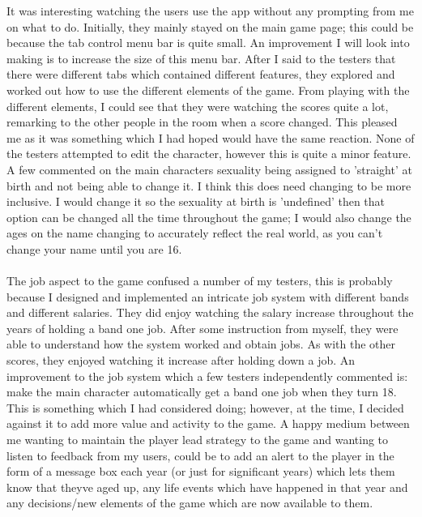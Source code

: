 It was interesting watching the users use the app without any prompting from me on what to do. Initially, they mainly stayed on the main game page; this could be because the tab control menu bar is quite small. An improvement I will look into making is to increase the size of this menu bar. After I said to the testers that there were different tabs which contained different features, they explored and worked out how to use the different elements of the game. From playing with the different elements, I could see that they were watching the scores quite a lot, remarking to the other people in the room when a score changed. This pleased me as it was something which I had hoped would have the same reaction. None of the testers attempted to edit the character, however this is quite a minor feature. A few commented on the main characters sexuality being assigned to 'straight' at birth and not being able to change it. I think this does need changing to be more inclusive. I would change it so the sexuality at birth is 'undefined' then that option can be changed all the time throughout the game; I would also change the ages on the name changing to accurately reflect the real world, as you can't change your name until you are 16. \\ \\
The job aspect to the game confused a number of my testers, this is probably because I designed and implemented an intricate job system with different bands and different salaries. They did enjoy watching the salary increase throughout the years of holding a band one job. After some instruction from myself, they were able to understand how the system worked and obtain jobs. As with the other scores, they enjoyed watching it increase after holding down a job.
An improvement to the job system which a few testers independently commented is: make the main  character automatically get a band one job when they turn 18. This is something which I had considered doing; however, at the time, I decided against it to add more value and activity to the game. A happy medium between me wanting to maintain the player lead strategy to the game and wanting to listen to feedback from my users, could be to add an alert to the player in the form of a message box each year (or just for significant years) which lets them know that they\textquotesingle ve aged up, any life events which have happened in that year and any decisions/new elements of the game which are now available to them. \\ \\
